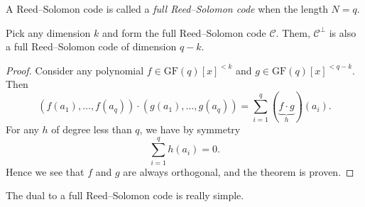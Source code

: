 \begin{example}
    A Reed--Solomon code is called a \textit{full Reed--Solomon code} when the length $N=q$. 
    \begin{theorem}
        Pick any dimension $k$ and form the full Reed--Solomon code $\mathcal{C}$. Them, $\mathcal{C}^\perp$ is also a full Reed--Solomon code of dimension $q-k$.
    \end{theorem}
    \begin{proof}
        Consider any polynomial $f\in\mathrm{GF}(q)[x]^{<k}$ and $g\in\mathrm{GF}(q)[x]^{<q-k}$. Then
        \begin{equation*}
            \left(f(a_1),\ldots,f(a_q)\right) \cdot \left(g(a_1),\ldots,g(a_q)\right) = \sum_{i=1}^q (\underbrace{f\cdot g}_{h})(a_i).
        \end{equation*}
        For any $h$ of degree less than $q$, we have by symmetry
        \begin{equation*}
            \sum_{i=1}^q h(a_i) = 0.
        \end{equation*}
        Hence we see that $f$ and $g$ are always orthogonal, and the theorem is proven.
    \end{proof}
    The dual to a full Reed--Solomon code is really simple.
\end{example}

